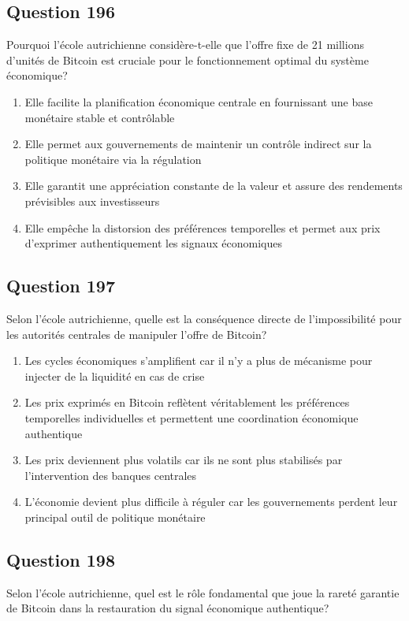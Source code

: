\documentclass[12pt,a4paper]{article}
\begin{document}
\bigskip


\subsection*{Question 196}
Pourquoi l'école autrichienne considère-t-elle que l'offre fixe de 21 millions d'unités de Bitcoin est cruciale pour le fonctionnement optimal du système économique?

\begin{enumerate}[label=\Alph*., leftmargin=*]
\item Elle facilite la planification économique centrale en fournissant une base monétaire stable et contrôlable
\item Elle permet aux gouvernements de maintenir un contrôle indirect sur la politique monétaire via la régulation
\item Elle garantit une appréciation constante de la valeur et assure des rendements prévisibles aux investisseurs
\item Elle empêche la distorsion des préférences temporelles et permet aux prix d'exprimer authentiquement les signaux économiques
\end{enumerate}

\bigskip


\subsection*{Question 197}
Selon l'école autrichienne, quelle est la conséquence directe de l'impossibilité pour les autorités centrales de manipuler l'offre de Bitcoin?

\begin{enumerate}[label=\Alph*., leftmargin=*]
\item Les cycles économiques s'amplifient car il n'y a plus de mécanisme pour injecter de la liquidité en cas de crise
\item Les prix exprimés en Bitcoin reflètent véritablement les préférences temporelles individuelles et permettent une coordination économique authentique
\item Les prix deviennent plus volatils car ils ne sont plus stabilisés par l'intervention des banques centrales
\item L'économie devient plus difficile à réguler car les gouvernements perdent leur principal outil de politique monétaire
\end{enumerate}

\bigskip


\subsection*{Question 198}
Selon l'école autrichienne, quel est le rôle fondamental que joue la rareté garantie de Bitcoin dans la restauration du signal économique authentique?
\end{document}
